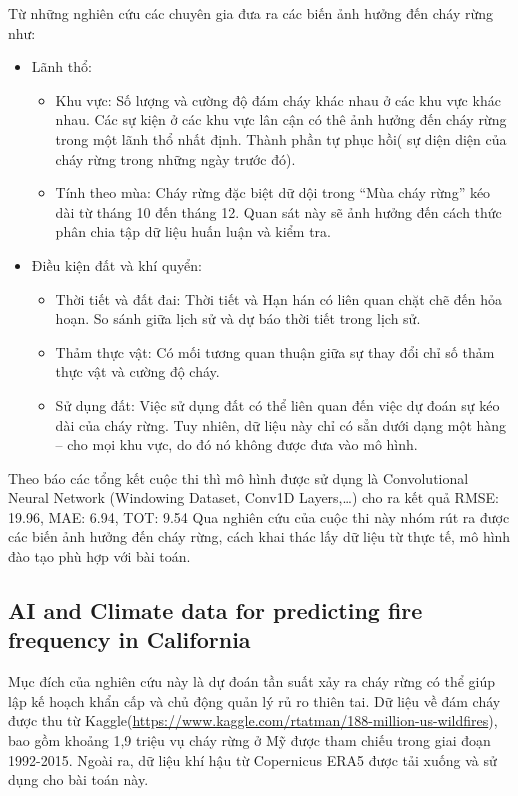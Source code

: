 \documentclass{article}
\begin{document}
Từ những nghiên cứu các chuyên gia đưa ra các biến ảnh hưởng đến cháy rừng như:
\begin{itemize}
	\item Lãnh thổ:
	      \begin{itemize}
		      \item Khu vực: Số lượng và cường độ đám cháy khác nhau ở các khu vực khác nhau. Các sự kiện ở các khu vực lân cận có thê ảnh hưởng đến cháy rừng trong một lãnh thổ nhất định. Thành phần tự phục hồi( sự diện diện của cháy rừng trong những ngày trước đó).
		      \item Tính theo mùa: Cháy rừng đặc biệt dữ dội trong “Mùa cháy rừng” kéo dài từ tháng 10 đến tháng 12. Quan sát này sẽ ảnh hưởng đến cách thức phân chia tập dữ liệu huấn luận và kiểm tra.
	      \end{itemize}
	\item Điều kiện đất và khí quyển:
	      \begin{itemize}
		      \item Thời tiết và đất đai: Thời tiết và Hạn hán có liên quan chặt chẽ đến hỏa hoạn. So sánh giữa lịch sử và dự báo thời tiết trong lịch sử.
		      \item Thảm thực vật: Có mối tương quan thuận giữa sự thay đổi chỉ số thảm thực vật và cường độ cháy.
		      \item Sử dụng đất: Việc sử dụng đất có thể liên quan đến việc dự đoán sự kéo dài của cháy rừng. Tuy nhiên, dữ liệu này chỉ có sẳn dưới dạng một hàng – cho mọi khu vực, do đó nó không được đưa vào mô hình.
	      \end{itemize}
\end{itemize}
Theo báo các tổng kết cuộc thi thì mô hình được sử dụng là Convolutional Neural Network (Windowing Dataset, Conv1D Layers,…) cho ra kết quả RMSE: 19.96, MAE: 6.94, TOT: 9.54
Qua nghiên cứu của cuộc thi này nhóm rút ra được các biến ảnh hưởng đến cháy rừng, cách khai thác lấy dữ liệu từ thực tế, mô hình đào tạo phù hợp với bài toán.
\subsection{AI and Climate data for predicting fire frequency in California}
Mục đích của nghiên cứu này là dự đoán tần suất xảy ra cháy rừng có thể giúp lập kế hoạch khẩn cấp và chủ động quản lý rủ ro thiên tai.
Dữ liệu về đám cháy được thu từ Kaggle(\url{https://www.kaggle.com/rtatman/188-million-us-wildfires}), bao gồm khoảng 1,9 triệu vụ cháy rừng ở Mỹ được tham chiếu trong giai đoạn 1992-2015. Ngoài ra, dữ liệu khí hậu từ Copernicus ERA5 được tải xuống và sử dụng cho bài toán này.
\end{document}
